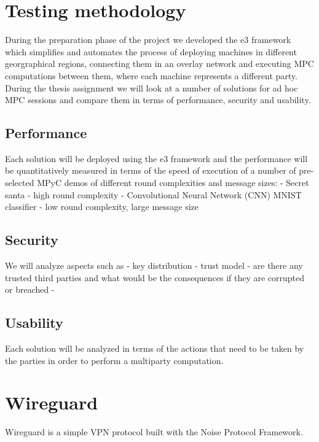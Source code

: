 \tableofcontents

\printnoidxglossary[type=\acronymtype,title=List of Abbreviations]
\listoffigures

\mainmatter

\hypertarget{testing-methodology}{%
\chapter{Testing methodology}\label{testing-methodology}}

During the preparation phase of the project we developed the \gls{e3}
framework which simplifies and automates the process of deploying
machines in different georgraphical regions, connecting them in an
overlay network and executing MPC computations between them, where each
machine represents a different party. During the thesis assignment we
will look at a number of solutions for ad hoc MPC sessions and compare
them in terms of performance, security and usability.

\hypertarget{performance}{%
\section{Performance}\label{performance}}

Each solution will be deployed using the \gls{e3} framework and the
performance will be quantitatively measured in terms of the speed of
execution of a number of pre-selected MPyC demos of different round
complexities and message sizes: - Secret santa - high round complexity -
Convolutional Neural Network (CNN) MNIST classifier - low round
complexity, large message size

\hypertarget{security}{%
\section{Security}\label{security}}

We will analyze aspects such as - key distribution - trust model - are
there any trusted third parties and what would be the consequences if
they are corrupted or breached -

\hypertarget{usability}{%
\section{Usability}\label{usability}}

Each solution will be analyzed in terms of the actions that need to be
taken by the parties in order to perform a multiparty computation.

\hypertarget{wireguard}{%
\chapter{Wireguard}\label{wireguard}}

Wireguard is a simple VPN protocol built with the Noise Protocol
Framework.
